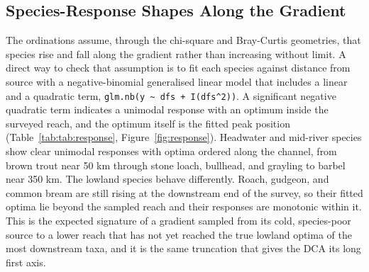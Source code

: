 \documentclass[11pt]{article}
\begin{document}
\subsection{Species-Response Shapes Along the Gradient}
The ordinations assume, through the chi-square and Bray-Curtis geometries, that species rise and fall along the gradient rather than increasing without limit. A direct way to check that assumption is to fit each species against distance from source with a negative-binomial generalised linear model that includes a linear and a quadratic term, \texttt{glm.nb(y \textasciitilde{} dfs + I(dfs\textasciicircum{}2))}. A significant negative quadratic term indicates a unimodal response with an optimum inside the surveyed reach, and the optimum itself is the fitted peak position (Table~\ref{tab:tab:response}, Figure~\ref{fig:response}). Headwater and mid-river species show clear unimodal responses with optima ordered along the channel, from brown trout near 50 km through stone loach, bullhead, and grayling to barbel near 350 km. The lowland species behave differently. Roach, gudgeon, and common bream are still rising at the downstream end of the survey, so their fitted optima lie beyond the sampled reach and their responses are monotonic within it. This is the expected signature of a gradient sampled from its cold, species-poor source to a lower reach that has not yet reached the true lowland optima of the most downstream taxa, and it is the same truncation that gives the DCA its long first axis.
\begin{table}[!h]
\centering
\caption{\label{tab:tab:response}Negative-binomial species-response models against distance from source. The fitted optimum is the peak of the quadratic response where it falls inside the surveyed reach; the quadratic p-value tests for curvature.}
\centering
{}
\end{table}
\end{document}

